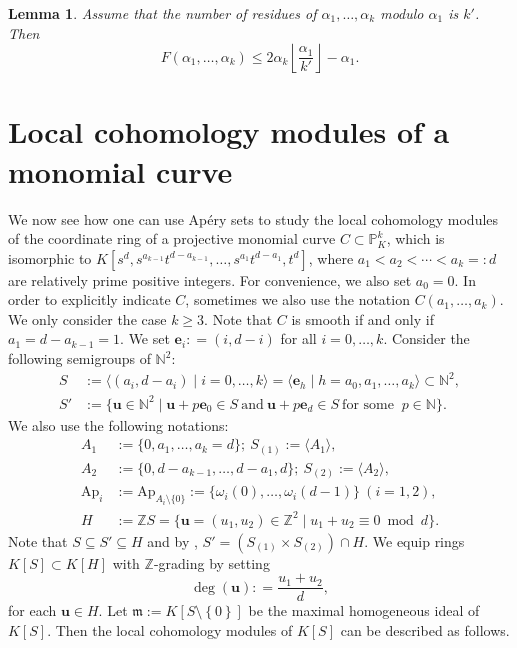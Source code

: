 \documentclass[11pt]{article}
\newtheorem{Lemma}[Theorem]{Lemma}
\def\deg{\operatorname{deg}}
\def\mfr{{\frak m}}
\def\ebf{{\mathbf e}}
\def\ubf{{\mathbf u}}
\def\mfr{{\mathfrak m}}
\def\Pset{{\mathbb P}}
\def\Zset{{\mathbb Z}}
\def\Nset{{\mathbb N}}
\theoremstyle{remark}
\theoremstyle{definition}
\begin{document}
\begin{Lemma} \label{Selmer2} Assume that the number of residues of $\alpha_1,\ldots, \alpha_k$ modulo $ \alpha_1$ is $k'$. Then
$$F(\alpha_1,\ldots,\alpha_k) \le 2 \alpha_k \left\lfloor \frac{\alpha_1}{k'} \right\rfloor - \alpha_1.$$
\end{Lemma}

\section{Local cohomology modules of a monomial curve} \label{Locoh}

We now see how one can use Ap\'ery sets to study the local cohomology modules of the coordinate ring of a projective monomial curve $C \subset \Pset^k_{K}$, which  is isomorphic to $K[s^d, s^{a_{k-1}}t^{d-a_{k-1}},\ldots, s^{a_1}t^{d-a_1}, t^d]$, where  $a_1< a_2 < \cdots < a_k =: d$ are  relatively prime positive integers. For convenience, we also set $a_0 = 0$. In order to explicitly indicate $C$, sometimes we also use the notation $C(a_1,\ldots,a_k)$. We only consider the case $k\ge 3$. Note that $C$ is smooth if and only if $a_1 = d-a_{k-1} = 1$.  We set  $\ebf_i : = (i,d-i)$ for all $i=0,\ldots,k$. Consider the following semigroups of $\Nset^2$:
$$\begin{array}{ll}
S &:=  \langle (a_i, d-a_i)\mid i= 0,\ldots,k\rangle = \langle \ebf_h\mid h = a_0, a_1,\ldots, a_k\rangle    \subset \Nset^2 , \\
S' & := \{ \ubf \in \Nset^2 \mid \ubf + p\ebf_0 \in S \ \text{and}\ \ubf + p\ebf_d \in S\ \text{for some }\ p \in \Nset\}.
\end{array}$$
We also use the following notations:
$$\begin{array}{ll}
A_1& := \{0, a_1,\ldots,a_k = d\}; \ S_{(1)} := \langle A_1\rangle,\\
A_2 & :=  \{0, d-a_{k-1},\ldots, d - a_1, d\}; \ S_{(2)} := \langle A_2\rangle, \\
 \mathrm{Ap}_i & := \mathrm{Ap}_{A_i\setminus \{0\}} := \{\omega_i(0),\ldots,\omega_i(d-1)\} \ (i=1,2), \\
 H & := \Zset S = \{ \ubf = (u_1,u_2) \in \Zset^2\mid u_1 + u_2 \equiv 0 \bmod d\}.
\end{array}$$
Note that $S\subseteq S' \subseteq H$ and by \cite[Lemma 2.1]{Br},  $S'= (S_{(1)} \times S_{(2)}) \cap H$. We equip rings $K[S] \subset K[H]$ with $\Zset$-grading by setting
$$\deg (\ubf) : = \frac{u_1 +u_2}{d},$$
for each $\ubf \in H$.
 Let $\mfr := K[S\setminus \left\{ 0 \right\}]$ be the maximal homogeneous ideal of $K[S]$. Then the local cohomology modules of $K[S]$ can be described as follows.
\end{document}
